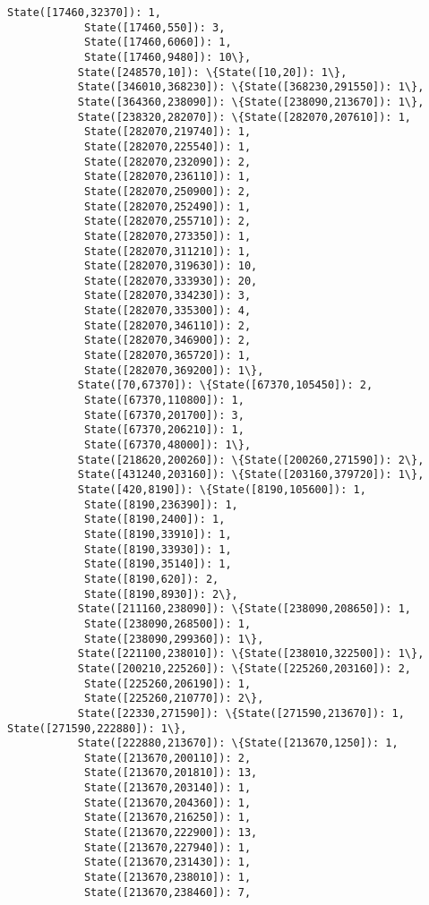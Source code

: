 \documentclass[11pt]{article}
\begin{document}
\begin{Verbatim}[commandchars=\\\{\}]
            State([17460,32370]): 1,
            State([17460,550]): 3,
            State([17460,6060]): 1,
            State([17460,9480]): 10\},
           State([248570,10]): \{State([10,20]): 1\},
           State([346010,368230]): \{State([368230,291550]): 1\},
           State([364360,238090]): \{State([238090,213670]): 1\},
           State([238320,282070]): \{State([282070,207610]): 1,
            State([282070,219740]): 1,
            State([282070,225540]): 1,
            State([282070,232090]): 2,
            State([282070,236110]): 1,
            State([282070,250900]): 2,
            State([282070,252490]): 1,
            State([282070,255710]): 2,
            State([282070,273350]): 1,
            State([282070,311210]): 1,
            State([282070,319630]): 10,
            State([282070,333930]): 20,
            State([282070,334230]): 3,
            State([282070,335300]): 4,
            State([282070,346110]): 2,
            State([282070,346900]): 2,
            State([282070,365720]): 1,
            State([282070,369200]): 1\},
           State([70,67370]): \{State([67370,105450]): 2,
            State([67370,110800]): 1,
            State([67370,201700]): 3,
            State([67370,206210]): 1,
            State([67370,48000]): 1\},
           State([218620,200260]): \{State([200260,271590]): 2\},
           State([431240,203160]): \{State([203160,379720]): 1\},
           State([420,8190]): \{State([8190,105600]): 1,
            State([8190,236390]): 1,
            State([8190,2400]): 1,
            State([8190,33910]): 1,
            State([8190,33930]): 1,
            State([8190,35140]): 1,
            State([8190,620]): 2,
            State([8190,8930]): 2\},
           State([211160,238090]): \{State([238090,208650]): 1,
            State([238090,268500]): 1,
            State([238090,299360]): 1\},
           State([221100,238010]): \{State([238010,322500]): 1\},
           State([200210,225260]): \{State([225260,203160]): 2,
            State([225260,206190]): 1,
            State([225260,210770]): 2\},
           State([22330,271590]): \{State([271590,213670]): 1, State([271590,222880]): 1\},
           State([222880,213670]): \{State([213670,1250]): 1,
            State([213670,200110]): 2,
            State([213670,201810]): 13,
            State([213670,203140]): 1,
            State([213670,204360]): 1,
            State([213670,216250]): 1,
            State([213670,222900]): 13,
            State([213670,227940]): 1,
            State([213670,231430]): 1,
            State([213670,238010]): 1,
            State([213670,238460]): 7,

\end{Verbatim}
\end{document}
